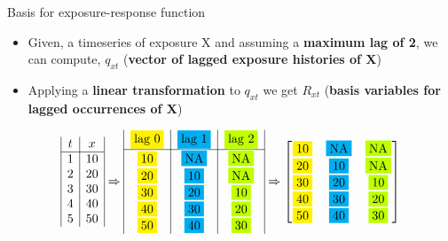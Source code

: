 \documentclass[english]{beamer}
\newcommand{\alertblue}[1]{{\color{blue}#1}}
\begin{document}
\begin{frame}{Basis for exposure-response function}
    \begin{itemize}
        \item Given, a timeseries of exposure X and assuming a \alertblue{\textbf{maximum lag of 2}},  we can compute, \alertblue{\(q_{xt}\)} (\alertblue{\textbf{vector of lagged exposure histories of X}})
        \item Applying a \alertblue{\textbf{linear transformation}} to \alertblue{\( q_{xt} \) } we get \alertblue{\( R_{xt}\)} (\alertblue{\textbf{basis variables for lagged occurrences of X}})
    \end{itemize}
    \vspace{0.5cm}
\[
\begin{array}{|c|c|}
    t & {x} \\ \hline
    1 & 10  \\
    2 & 20  \\
    3 & 30  \\
    4 & 40  \\
    5 & 50  
\end{array} 
\Rightarrow 
\begin{array}{|c|c|c|c|}
    \fcolorbox{white}{yellow}{lag 0} & \fcolorbox{white}{cyan}{lag 1} & \fcolorbox{white}{lime}{lag 2} \\ \hline
    \fcolorbox{white}{yellow}{10} & \fcolorbox{white}{cyan}{NA} & \fcolorbox{white}{lime}{NA} \\
    \fcolorbox{white}{yellow}{20}  & \fcolorbox{white}{cyan}{10} & \fcolorbox{white}{lime}{NA} \\
    \fcolorbox{white}{yellow}{30}  & \fcolorbox{white}{cyan}{20} & \fcolorbox{white}{lime}{10} \\
    \fcolorbox{white}{yellow}{40}  & \fcolorbox{white}{cyan}{30} & \fcolorbox{white}{lime}{20}  \\
    \fcolorbox{white}{yellow}{50}  & \fcolorbox{white}{cyan}{40} & \fcolorbox{white}{lime}{30} 
\end{array}
\Rightarrow  
\begin{bmatrix}
\fcolorbox{white}{yellow}{10} & \fcolorbox{white}{cyan}{NA} & \fcolorbox{white}{lime}{NA} \\
\fcolorbox{white}{yellow}{20} & \fcolorbox{white}{cyan}{10} & \fcolorbox{white}{lime}{NA} \\
\fcolorbox{white}{yellow}{30} & \fcolorbox{white}{cyan}{20} & \fcolorbox{white}{lime}{10} \\
\fcolorbox{white}{yellow}{40} & \fcolorbox{white}{cyan}{30} & \fcolorbox{white}{lime}{20} \\
\fcolorbox{white}{yellow}{50} & \fcolorbox{white}{cyan}{40} & \fcolorbox{white}{lime}{30} \\
\end{bmatrix}
\]
\end{frame}
\end{document}
